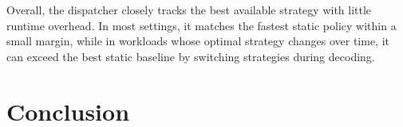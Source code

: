 \documentclass[11pt]{article}
\begin{document}
Overall, the dispatcher closely tracks the best available strategy with little runtime overhead. In most settings, it matches the fastest static policy within a small margin, while in workloads whose optimal strategy changes over time, it can exceed the best static baseline by switching strategies during decoding.


\begin{table}[t]
\centering
\small
{}
\caption{
Dispatcher diagnosis across models and scenarios. Lower is better.
The $s_{\rm 2f}$-only and $s_{\rm 2d}$-only columns report forced static execution with a single strategy. F1 = multi-doc-qa,
F2 = multi-few-shot, F3 = beam-search, and F4 = self-consistency.
}
\label{tab:picker_diagnosis}
\end{table}


\section{Conclusion}
\end{document}
